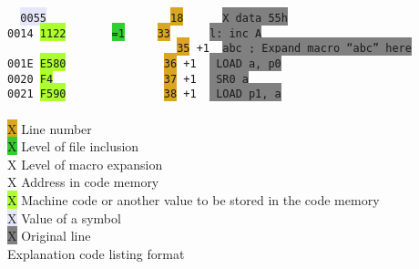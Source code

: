                 \begin{code}[h]
                        \verb'  '\texttt{\colorbox{Lavender}{0055}}\verb'                   '\texttt{\colorbox{Goldenrod}{18}}\verb'      '\texttt{\colorbox{Gray}{X      data     55h}} \\
                        \texttt{\colorbox{Apricot}{0014}}\verb' '\texttt{\colorbox{GreenYellow}{1122}}\verb'       '\texttt{\colorbox{LimeGreen}{=1}}\verb'     '\texttt{\colorbox{Goldenrod}{33}}\verb'      '\texttt{\colorbox{Gray}{l:     inc      A}} \\
                        \verb'                          '\texttt{\colorbox{Goldenrod}{35}}\verb' '\texttt{\colorbox{ProcessBlue}{+1}}\verb'  '\texttt{\colorbox{Gray}{abc     ; Expand macro ``abc'' here}} \\
                        \texttt{\colorbox{Apricot}{001E}}\verb' '\texttt{\colorbox{GreenYellow}{E580}}\verb'               '\texttt{\colorbox{Goldenrod}{36}}\verb' '\texttt{\colorbox{ProcessBlue}{+1}}\verb'  '\texttt{\colorbox{Gray}{                LOAD     a, p0}} \\
                        \texttt{\colorbox{Apricot}{0020}}\verb' '\texttt{\colorbox{GreenYellow}{F4}}\verb'                 '\texttt{\colorbox{Goldenrod}{37}}\verb' '\texttt{\colorbox{ProcessBlue}{+1}}\verb'  '\texttt{\colorbox{Gray}{                SR0     a}} \\
                        \texttt{\colorbox{Apricot}{0021}}\verb' '\texttt{\colorbox{GreenYellow}{F590}}\verb'               '\texttt{\colorbox{Goldenrod}{38}}\verb' '\texttt{\colorbox{ProcessBlue}{+1}}\verb'  '\texttt{\colorbox{Gray}{                LOAD     p1, a}} \\\\
                        \colorbox{Goldenrod}{\color{Goldenrod}X} Line number \\
                        \colorbox{LimeGreen}{\color{LimeGreen}X} Level of file inclusion \\
                        \colorbox{ProcessBlue}{\color{ProcessBlue}X} Level of macro expansion \\
                        \colorbox{Apricot}{\color{Apricot}X} Address in code memory \\
                        \colorbox{GreenYellow}{\color{GreenYellow}X} Machine code or another value to be stored in the code memory \\
                        \colorbox{Lavender}{\color{Lavender}X} Value of a symbol \\
                        \colorbox{Gray}{\color{Gray}X} Original line \\

                        \caption{Explanation code listing format}
                \end{code}

